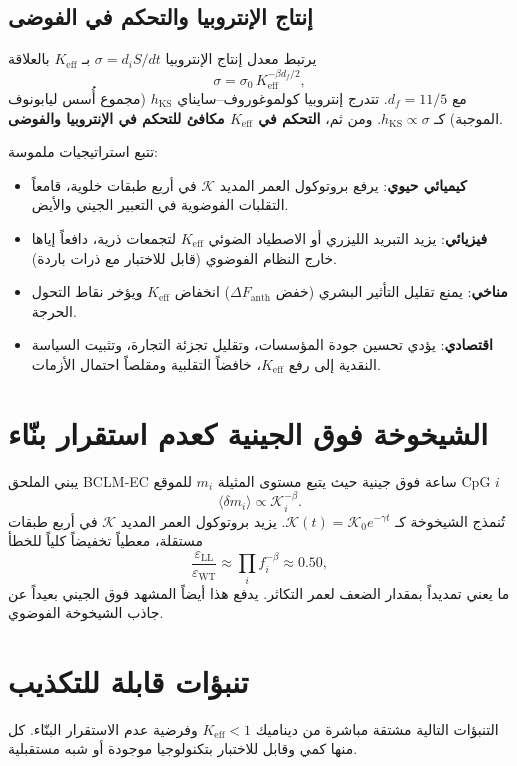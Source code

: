 \documentclass[12pt,a4paper]{article}
\newcommand{\Keff}{K_{\mathrm{eff}}}
\newcommand{\REL}{\mathcal{K}}
\begin{document}
	\subsection{إنتاج الإنتروبيا والتحكم في الفوضى}
	يرتبط معدل إنتاج الإنتروبيا \(\sigma = d_iS/dt\) بـ \(\Keff\) بالعلاقة
	\[
	\sigma = \sigma_0\, \Keff^{-\beta d_f/2},
	\]
	مع \(d_f = 11/5\). تتدرج إنتروبيا كولموغوروف–سايناي \(h_{\mathrm{KS}}\) (مجموع أُسس ليابونوف الموجبة) كـ \(h_{\mathrm{KS}} \propto \sigma\). ومن ثم، \textbf{التحكم في \(\Keff\) مكافئ للتحكم في الإنتروبيا والفوضى}.
	
	تتبع استراتيجيات ملموسة:
	\begin{itemize}
		\item \textbf{كيميائي حيوي}: يرفع بروتوكول العمر المديد \(\REL\) في أربع طبقات خلوية، قامعاً التقلبات الفوضوية في التعبير الجيني والأيض.
		\item \textbf{فيزيائي}: يزيد التبريد الليزري أو الاصطياد الضوئي \(\Keff\) لتجمعات ذرية، دافعاً إياها خارج النظام الفوضوي (قابل للاختبار مع ذرات باردة).
		\item \textbf{مناخي}: يمنع تقليل التأثير البشري (خفض \(\Delta F_{\mathrm{anth}}\)) انخفاض \(\Keff\) ويؤخر نقاط التحول الحرجة.
		\item \textbf{اقتصادي}: يؤدي تحسين جودة المؤسسات، وتقليل تجزئة التجارة، وتثبيت السياسة النقدية إلى رفع \(\Keff\)، خافضاً التقلبية ومقلصاً احتمال الأزمات.
	\end{itemize}
	
	\section{الشيخوخة فوق الجينية كعدم استقرار بنّاء}
	يبني الملحق BCLM‑EC ساعة فوق جينية حيث يتبع مستوى المثيلة \(m_i\) للموقع CpG \(i\)
	\[
	\langle \delta m_i \rangle \propto \REL_i^{-\beta}.
	\]
	تُنمذج الشيخوخة كـ \(\REL(t) = \REL_0 e^{-\gamma t}\). يزيد بروتوكول العمر المديد \(\REL\) في أربع طبقات مستقلة، معطياً تخفيضاً كلياً للخطأ
	\[
	\frac{\varepsilon_{\mathrm{LL}}}{\varepsilon_{\mathrm{WT}}} \approx \prod_i f_i^{-\beta}
	\approx 0.50,
	\]
	ما يعني تمديداً بمقدار الضعف لعمر التكاثر. يدفع هذا أيضاً المشهد فوق الجيني بعيداً عن جاذب الشيخوخة الفوضوي.
	
	\section{تنبؤات قابلة للتكذيب}
	التنبؤات التالية مشتقة مباشرة من ديناميك \(\Keff < 1\) وفرضية عدم الاستقرار البنّاء. كل منها كمي وقابل للاختبار بتكنولوجيا موجودة أو شبه مستقبلية.
	
\end{document}
